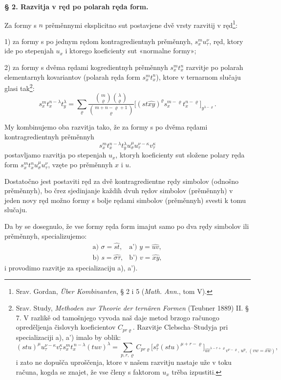 \documentclass[11pt]{article}
\begin{document}
\begin{center}
\textbf{§ 2. \quad Razvitja v ręd po polarah ręda form.}
\end{center}

Za formy s $n$ prěměnnymi eksplicitno sut postavjene dvě vrsty razvitij v ręd\footnote{Srav. Gordan, \emph{Über Kombinanten}, § 2 i 5 (\emph{Math. Ann.}, tom V).}:

1) za formy s po jednym rędom kontragredientnyh prěměnnyh, $s_x^m u_\tau^\nu$, ręd, ktory ide po stepenjah $u_x$ i ktorego koeficienty sut «normalne formy»;

2) za formy s dvěma rędami kogredientnyh prěměnnyh $s_x^m t_x^n$ razvitje po polarah elementarnyh kovariantov (polarah ręda form $s_x^m t_x^n$), ktore v ternarnom slučaju glasi tak\footnote{Srav. Study, \emph{Methoden zur Theorie der ternären Formen} (Teubner 1889) II. § 7. V razlikě od tamošnjego vyvoda naš daje metod brzogo računogo opreděljenja čislovyh koeficientov $C_{pr\varrho}$. Razvitje Clebscha--Studyja pri specializaciji a), a') imalo by oblik:
\[
(stu)^\mu u_\tau^{\nu-\kappa}v_\tau^\kappa s_x^m t_x^{\,n-\lambda}(tuv)^\lambda
=\sum_{p,r,\varrho} C_{pr\varrho}
\bigl[s_\tau^\varrho(stu)^{\mu+r-\varrho}\bigr]_{\widehat{uv}^{\lambda-r+\varrho}v^{\nu-\varrho},\,u^p,\,(vw=\widehat{xw})},
\]
i zato ne dopušča uproščenja, ktore v našem razvitju nastaje uže v toku računa, kogda se znajet, že vse členy s faktorom $u_x$ trěba izpustiti.}:
\[
\tag{I}
s_x^m t_x^{n-\lambda}t_y^\lambda
=\sum_{\varrho}
\frac{\binom{m}{\varrho}\binom{\lambda}{\varrho}}
{\binom{m+n-\varrho+1}{\varrho}}
\bigl[(st\widehat{xy})^\varrho s_x^{m-\varrho}t_x^{n-\varrho}\bigr]_{y^{\lambda-\varrho}}.
\]

My kombinujemo oba razvitja tako, že za formy s po dvěma rędami kontragredientnyh prěměnnyh
\[
s_x^m t_x^{n-\lambda}t_y^\lambda u_\sigma^\mu u_\tau^{\nu-\kappa}v_\tau^\kappa
\]
postavljamo razvitja po stepenjah $u_x$, ktoryh koeficienty sut složene polary ręda form $s_x^m t_x^n u_\sigma^\mu u_\tau^\nu$, vzęte po prěměnnyh $x$ i $u$.

Dostatočno jest postaviti ręd za dvě kontragredientne rędy simbolov (odnošno prěměnnyh), bo črez sjedinjanje každih dvuh rędov simbolov (prěměnnyh) v jeden novy ręd možno formy s bolje rędami simbolov (prěměnnyh) svesti k tomu slučaju.

Da by se dosegnulo, že vse formy ręda form imajut samo po dva rędy simbolov ili prěměnnyh, specializujemo:
\[
\begin{array}{ll}
\text{a) } \sigma=\widehat{st}, & \text{a') } y=\widehat{uv},\\[0.3em]
\text{b) } s=\widehat{\sigma\tau}, & \text{b') } v=\widehat{xy},
\end{array}
\]
i provodimo razvitje za specializaciju a), a').
\end{document}
